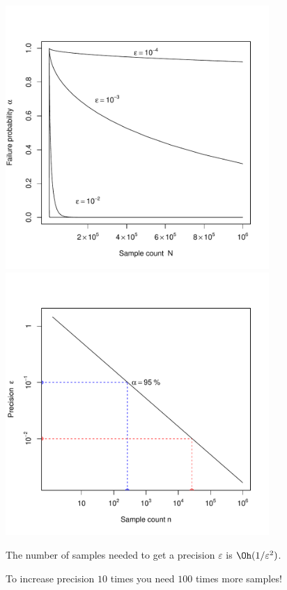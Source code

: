 \documentclass[landscape,footrule]{foils}
\begin{document}

\begin{center}
\includegraphics[width=10cm]{sampling-bound-1}\hspace*{1cm}
\includegraphics[width=10cm]{sampling-bound-2}
\end{center}
\vspace*{-0.5cm}

The number of samples needed to get a precision $\varepsilon$ is $\Oh(1/\varepsilon^2)$. 
\begin{triangles}
\item To increase precision $10$ times you need $100$ times more samples!
\end{triangles}
\end{document}
